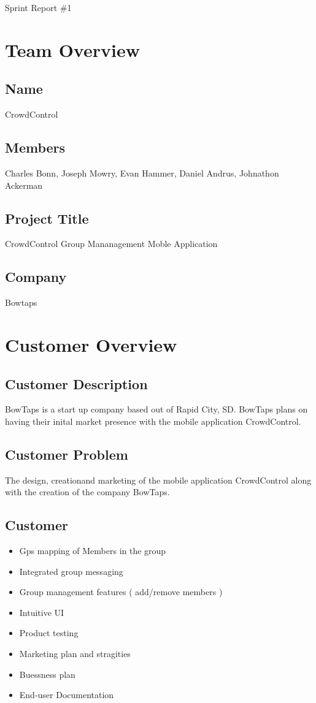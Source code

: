 
{\fontsize{16}{16}\selectfont Sprint Report \#1}

\section*{Team Overview}

\subsection*{Name}
CrowdControl
\subsection*{Members}
Charles Bonn, Joseph Mowry, Evan Hammer, Daniel Andrus, Johnathon Ackerman
\subsection*{Project Title}
CrowdControl Group Mananagement Moble Application
\subsection*{Company}
Bowtaps

\section*{Customer Overview}

\subsection*{Customer Description}
BowTaps is a start up company based out of Rapid City, SD. BowTaps plans on having their inital market presence with the mobile application CrowdControl.

\subsection*{Customer Problem}
The design, creationand marketing of the mobile application CrowdControl along with the creation of the company BowTaps.

\subsection*{Customer}

	\begin{itemize}
		\item Gps mapping of Members in the group
		\item Integrated group messaging
		\item Group management features ( add/remove members )
		\item Intuitive UI
		\item Product testing
		\item Marketing plan and stragities
		\item Buessness plan
		\item End-user Documentation
	\end{itemize}
